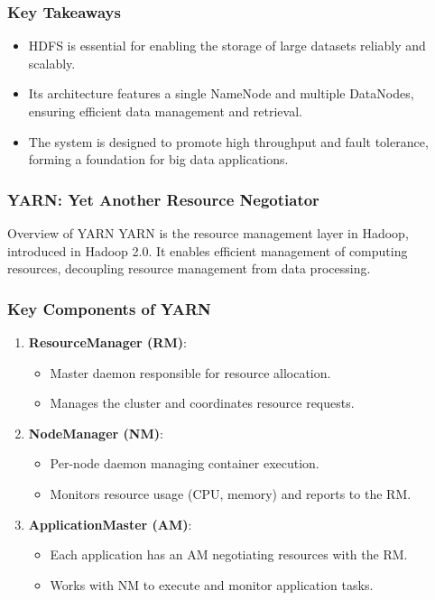 \documentclass[aspectratio=169]{beamer}
\begin{document}
\begin{frame}[fragile]
    \frametitle{Key Takeaways}
    \begin{itemize}
        \item HDFS is essential for enabling the storage of large datasets reliably and scalably.
        \item Its architecture features a single NameNode and multiple DataNodes, ensuring efficient data management and retrieval.
        \item The system is designed to promote high throughput and fault tolerance, forming a foundation for big data applications.
    \end{itemize}
\end{frame}

\begin{frame}[fragile]
    \frametitle{YARN: Yet Another Resource Negotiator}
    \begin{block}{Overview of YARN}
        YARN is the resource management layer in Hadoop, introduced in Hadoop 2.0.
        It enables efficient management of computing resources, decoupling resource management from data processing.
    \end{block}
\end{frame}

\begin{frame}[fragile]
    \frametitle{Key Components of YARN}
    \begin{enumerate}
        \item \textbf{ResourceManager (RM)}:
        \begin{itemize}
            \item Master daemon responsible for resource allocation.
            \item Manages the cluster and coordinates resource requests.
        \end{itemize}
        
        \item \textbf{NodeManager (NM)}:
        \begin{itemize}
            \item Per-node daemon managing container execution.
            \item Monitors resource usage (CPU, memory) and reports to the RM.
        \end{itemize}
        
        \item \textbf{ApplicationMaster (AM)}:
        \begin{itemize}
            \item Each application has an AM negotiating resources with the RM.
            \item Works with NM to execute and monitor application tasks.
        \end{itemize}
    \end{enumerate}
\end{frame}
\end{document}

